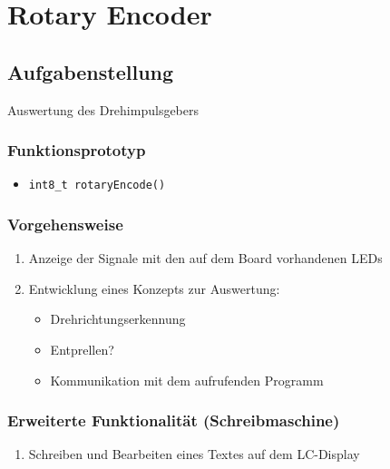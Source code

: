 \section{Rotary Encoder}
\subsection{Aufgabenstellung}

Auswertung des Drehimpulsgebers

\subsubsection*{Funktionsprototyp}
\begin{itemize}
	\item \texttt{\textcolor{bluetypes}{int8\_t} rotaryEncode()}
\end{itemize}
\subsubsection*{Vorgehensweise}
\begin{enumerate}
	\item Anzeige der Signale mit den auf dem Board vorhandenen LEDs
	\item Entwicklung eines Konzepts zur Auswertung:
	\begin{itemize}
		\item Drehrichtungserkennung
		\item Entprellen?
		\item Kommunikation mit dem aufrufenden Programm		
	\end{itemize}
\end{enumerate}

\subsubsection*{Erweiterte Funktionalität (Schreibmaschine)}
\begin{enumerate}%
		\item Schreiben und Bearbeiten eines Textes auf dem LC-Display
\end{enumerate}


